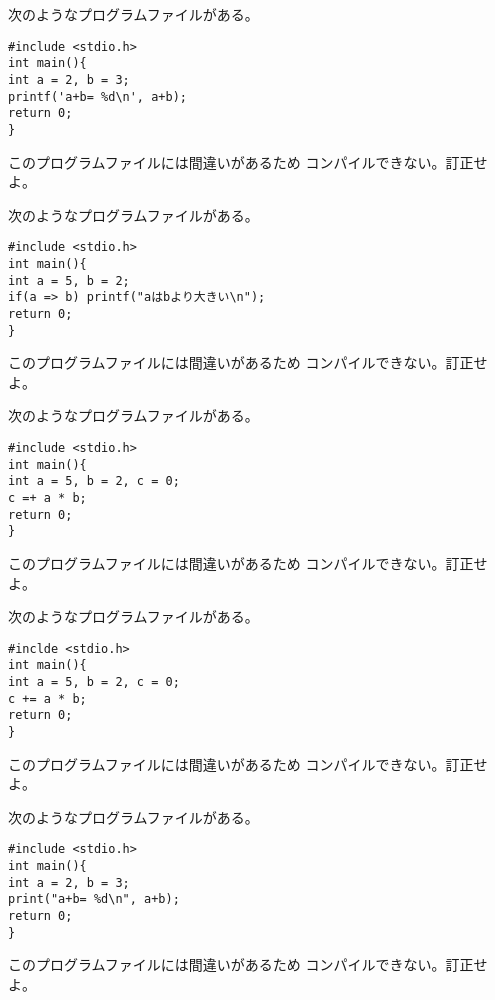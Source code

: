 \documentclass[12pt,a4j]{jarticle}
\newcounter{toi}
\def\toi{%
\bigskip\bigskip\noindent
\addtocounter{toi}{1}
\shadowbox{\bfseries\large 問\thetoi}
\nopagebreak[4]\bigskip\nopagebreak[4]
}
\begin{document}
\toi


次のようなプログラムファイルがある。
\begin{verbatim}
#include <stdio.h>
int main(){
int a = 2, b = 3;
printf('a+b= %d\n', a+b);
return 0;
}
\end{verbatim}
このプログラムファイルには間違いがあるため
コンパイルできない。訂正せよ。




\toi


次のようなプログラムファイルがある。
\begin{verbatim}
#include <stdio.h>
int main(){
int a = 5, b = 2;
if(a => b) printf("aはbより大きい\n");
return 0;
}
\end{verbatim}
このプログラムファイルには間違いがあるため
コンパイルできない。訂正せよ。




\toi

次のようなプログラムファイルがある。
\begin{verbatim}
#include <stdio.h>
int main(){
int a = 5, b = 2, c = 0;
c =+ a * b;
return 0;
}
\end{verbatim}
このプログラムファイルには間違いがあるため
コンパイルできない。訂正せよ。



\toi


次のようなプログラムファイルがある。
\begin{verbatim}
#inclde <stdio.h>
int main(){
int a = 5, b = 2, c = 0;
c += a * b;
return 0;
}
\end{verbatim}
このプログラムファイルには間違いがあるため
コンパイルできない。訂正せよ。




\toi

次のようなプログラムファイルがある。
\begin{verbatim}
#include <stdio.h>
int main(){
int a = 2, b = 3;
print("a+b= %d\n", a+b);
return 0;
}
\end{verbatim}
このプログラムファイルには間違いがあるため
コンパイルできない。訂正せよ。
\end{document}
